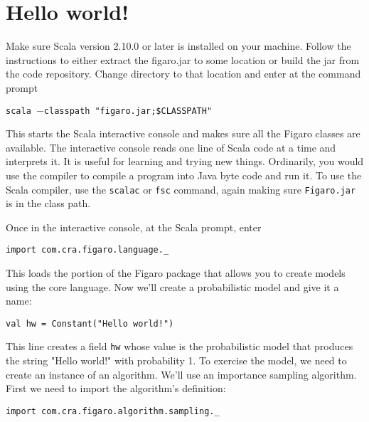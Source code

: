 
\chapter{Hello world!} %

\label{Hello world!} %


Make sure Scala version 2.10.0 or later is installed on your machine. Follow the instructions to either extract the figaro.jar to some location or build the jar from the code repository. Change directory to that location and enter at the command prompt

\begin{flushleft}
\texttt{scala $-$classpath "figaro.jar;\$CLASSPATH"}
\end{flushleft}

This starts the Scala interactive console and makes sure all the Figaro classes are available. The interactive console reads one line of Scala code at a time and interprets it. It is useful for learning and trying new things. Ordinarily, you would use the compiler to compile a program into Java byte code and run it. To use the Scala compiler, use the \texttt{scalac} or  \texttt{fsc} command, again making sure \texttt{Figaro.jar} is in the class path.

Once in the interactive console, at the Scala prompt, enter

\begin{flushleft}
\texttt{import com.cra.figaro.language.\_}
\end{flushleft}

This loads the portion of the Figaro package that allows you to create models using the core language. Now we'll create a probabilistic model and give it a name:

\begin{flushleft}
\texttt{val hw = Constant("Hello world!")}
\end{flushleft}

This line creates a field \texttt{hw} whose value is the probabilistic model that produces the string "Hello world!" with probability 1. To exercise the model, we need to create an instance of an algorithm. We'll use an importance sampling algorithm. First we need to import the algorithm's definition:

\begin{flushleft}
\texttt{import com.cra.figaro.algorithm.sampling.\_}
\end{flushleft}

